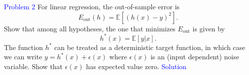 \textcolor{blue}{Problem 2}
For linear regression, the out-of-sample error is 
\begin{equation}
    E_{\text{out}}(h)=\mathbb{E}[{(h(x)-y)}^2].
\end{equation}
Show that among all hypotheses, the one that minimizes $E_{\text{out}}$ is given by
\begin{equation}
    h^*(x)=\mathbb{E}[y|x].
\end{equation}
The function $h^*$ can be treated as a deterministic target function, in which case we can write $y=h^*(x)+\epsilon(x)$ where $\epsilon(x)$ is an (input dependent) noise variable. Show that $\epsilon(x)$ has expected value zero.
\newline
\textcolor{blue}{Solution}













\newpage